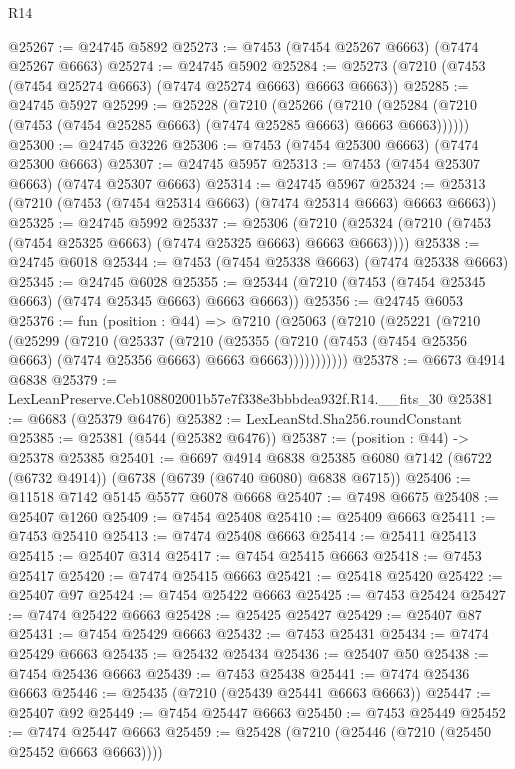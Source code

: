 \begin{lexlean}{R14}
\begin{coremodule}
@25267 := @24745 @5892
@25273 := @7453 (@7454 @25267 @6663) (@7474 @25267 @6663)
@25274 := @24745 @5902
@25284 := @25273 (@7210 (@7453 (@7454 @25274 @6663) (@7474 @25274 @6663) @6663 @6663))
@25285 := @24745 @5927
@25299 := @25228
    (@7210
      (@25266
        (@7210 (@25284 (@7210 (@7453 (@7454 @25285 @6663) (@7474 @25285 @6663) @6663 @6663))))))
@25300 := @24745 @3226
@25306 := @7453 (@7454 @25300 @6663) (@7474 @25300 @6663)
@25307 := @24745 @5957
@25313 := @7453 (@7454 @25307 @6663) (@7474 @25307 @6663)
@25314 := @24745 @5967
@25324 := @25313 (@7210 (@7453 (@7454 @25314 @6663) (@7474 @25314 @6663) @6663 @6663))
@25325 := @24745 @5992
@25337 := @25306
    (@7210 (@25324 (@7210 (@7453 (@7454 @25325 @6663) (@7474 @25325 @6663) @6663 @6663))))
@25338 := @24745 @6018
@25344 := @7453 (@7454 @25338 @6663) (@7474 @25338 @6663)
@25345 := @24745 @6028
@25355 := @25344 (@7210 (@7453 (@7454 @25345 @6663) (@7474 @25345 @6663) @6663 @6663))
@25356 := @24745 @6053
@25376 := fun (position : @44) =>
  @7210
    (@25063
      (@7210
        (@25221
          (@7210
            (@25299
              (@7210
                (@25337
                  (@7210
                    (@25355
                      (@7210 (@7453 (@7454 @25356 @6663) (@7474 @25356 @6663) @6663 @6663)))))))))))
@25378 := @6673 @4914 @6838
@25379 := LexLeanPreserve.Ceb108802001b57e7f338e3bbbdea932f.R14.__fits_30
@25381 := @6683 (@25379 @6476)
@25382 := LexLeanStd.Sha256.roundConstant
@25385 := @25381 (@544 (@25382 @6476))
@25387 := (position : @44) -> @25378 @25385
@25401 := @6697
    @4914
    @6838
    @25385
    @6080
    @7142
    (@6722 (@6732 @4914))
    (@6738 (@6739 (@6740 @6080) @6838 @6715))
@25406 := @11518 @7142 @5145 @5577 @6078 @6668
@25407 := @7498 @6675
@25408 := @25407 @1260
@25409 := @7454 @25408
@25410 := @25409 @6663
@25411 := @7453 @25410
@25413 := @7474 @25408 @6663
@25414 := @25411 @25413
@25415 := @25407 @314
@25417 := @7454 @25415 @6663
@25418 := @7453 @25417
@25420 := @7474 @25415 @6663
@25421 := @25418 @25420
@25422 := @25407 @97
@25424 := @7454 @25422 @6663
@25425 := @7453 @25424
@25427 := @7474 @25422 @6663
@25428 := @25425 @25427
@25429 := @25407 @87
@25431 := @7454 @25429 @6663
@25432 := @7453 @25431
@25434 := @7474 @25429 @6663
@25435 := @25432 @25434
@25436 := @25407 @50
@25438 := @7454 @25436 @6663
@25439 := @7453 @25438
@25441 := @7474 @25436 @6663
@25446 := @25435 (@7210 (@25439 @25441 @6663 @6663))
@25447 := @25407 @92
@25449 := @7454 @25447 @6663
@25450 := @7453 @25449
@25452 := @7474 @25447 @6663
@25459 := @25428 (@7210 (@25446 (@7210 (@25450 @25452 @6663 @6663))))

\end{coremodule}
\end{lexlean}

